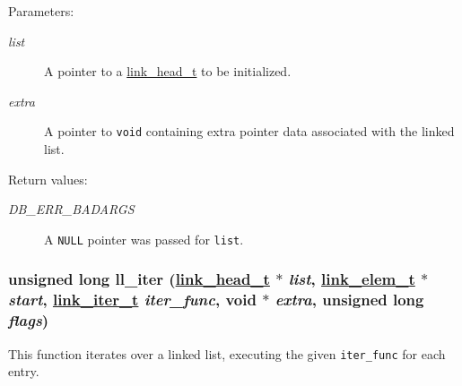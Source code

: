 \begin{Desc}
\item[Parameters:]
\begin{description}
\item[{\em list}]A pointer to a \hyperlink{group__dbprim__link_a0}{link\_\-head\_\-t} to be initialized. \item[{\em extra}]A pointer to {\tt void} containing extra pointer data associated with the linked list.\end{description}
\end{Desc}
\begin{Desc}
\item[Return values:]
\begin{description}
\item[{\em DB\_\-ERR\_\-BADARGS}]A {\tt NULL} pointer was passed for {\tt list}. \end{description}
\end{Desc}
\hypertarget{group__dbprim__link_a10}{
\subsubsection[ll\_\-iter]{\setlength{\rightskip}{0pt plus 5cm}unsigned long ll\_\-iter (\hyperlink{dbprim_8h_a0}{link\_\-head\_\-t} $\ast$ {\em list}, \hyperlink{dbprim_8h_a1}{link\_\-elem\_\-t} $\ast$ {\em start}, \hyperlink{dbprim_8h_a2}{link\_\-iter\_\-t} {\em iter\_\-func}, void $\ast$ {\em extra}, unsigned long {\em flags})}}
\label{group__dbprim__link_a10}


This function iterates over a linked list, executing the given {\tt iter\_\-func} for each entry.

